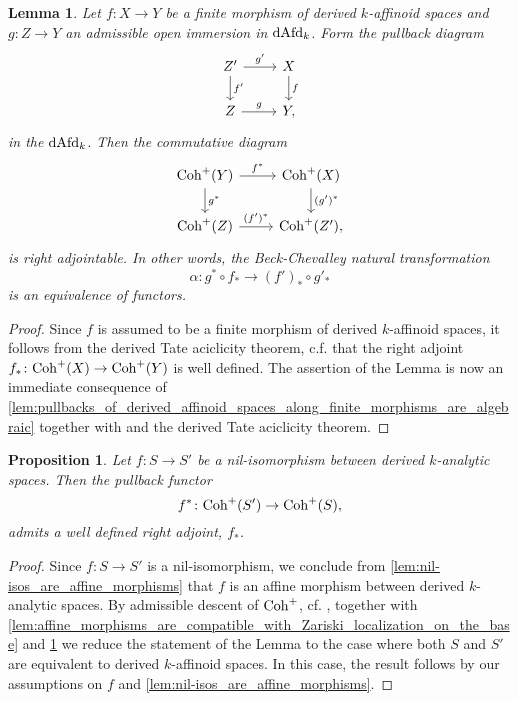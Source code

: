 \documentclass[10pt,a4paper,reqno]{amsart} %
\theoremstyle{plain}
\newtheorem{lem}[thm]{Lemma}
\newtheorem{prop}[thm]{Proposition}
\theoremstyle{definition}
\theoremstyle{remark}
\numberwithin{equation}{section}
\begin{document}
\begin{lem} \label{lem:Beck_Chevalley_natural_transformation_equivalence}
    Let $f \colon X \to Y$ be a finite morphism of derived $k$-affinoid spaces and $g \colon Z \to Y$ an admissible open immersion in $\mathrm{dAfd}_k$. Form the pullback diagram
        \[
        \begin{tikzcd}
            Z' \ar{r}{g'}  \ar{d}{f'} & X \ar{d}{f} \\
            Z \ar{r}{g} & Y,
        \end{tikzcd}
        \]
    in the \infcat $\mathrm{dAfd}_k$.
    Then the commutative diagram
        \[
        \begin{tikzcd}
            \Coh^+(Y) \ar{r}{f^*} \ar{d}{g^*} & \Coh^+(X) \ar{d}{(g')^*} \\
            \Coh^+(Z) \ar{r}{(f')^*} & \Coh^+(Z'),
        \end{tikzcd}
        \]
    is right adjointable. In other words, the Beck-Chevalley natural transformation
        \[
            \alpha \colon g^* \circ f_* \to (f')_* \circ g'_* 
        \]
    is an equivalence of functors.
\end{lem}

\begin{proof}
    Since $f$ is assumed to be a finite morphism of derived $k$-affinoid spaces, it follows from the derived Tate aciclicity theorem, c.f. \cite[Theorem 3.1]{Porta_Yu_Derived_Hom_spaces}
    that the right adjoint $f_* \colon \mathrm{Coh}^+(X) \to \mathrm{Coh}^+(Y)$ is well defined. The assertion of the Lemma is now an immediate consequence of \cref{lem:pullbacks_of_derived_affinoid_spaces_along_finite_morphisms_are_algebraic}
    together with \cite[Proposition 2.5.4.5]{Lurie_SAG} and the derived Tate aciclicity theorem.
\end{proof}

\begin{prop} \label{lem:f^*_admits_a_right_adjoint_whenever_f_is_nil-iso}
    Let $f \colon S \to S'$ be a nil-isomorphism between derived $k$-analytic spaces. Then the pullback functor
        \[
            f^* \colon \mathrm{Coh}^+(S') \to \mathrm{Coh}^+(S),  
        \]
    admits a well defined right adjoint, $f_*$.
\end{prop}

\begin{proof}
    Since $f \colon S \to S'$ is a nil-isomorphism, we conclude from \cref{lem:nil-isos_are_affine_morphisms} that $f$ is an affine morphism
    between derived $k$-analytic spaces. By admissible descent of $\mathrm{Coh}^+$, cf. \cite[Theorem 3.7]{Antonio_Porta_Nonarchimedean_Hilbert},
    together with \cref{lem:affine_morphisms_are_compatible_with_Zariski_localization_on_the_base} and \cref{lem:Beck_Chevalley_natural_transformation_equivalence} we reduce the statement of the Lemma to the case
    where both $S$ and $S'$ are equivalent to derived $k$-affinoid spaces. In this case, the result follows by our assumptions on $f$ and \cref{lem:nil-isos_are_affine_morphisms}.
\end{proof}
\end{document}
